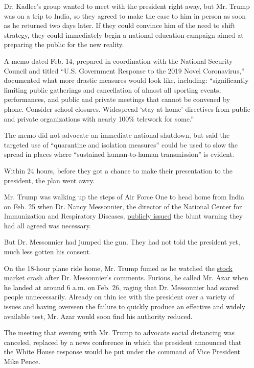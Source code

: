 Dr. Kadlec's group wanted to meet with the president right away, but Mr.
Trump was on a trip to India, so they agreed to make the case to him in
person as soon as he returned two days later. If they could convince him
of the need to shift strategy, they could immediately begin a national
education campaign aimed at preparing the public for the new reality.

A memo dated Feb. 14, prepared in coordination with the National
Security Council and titled ``U.S. Government Response to the 2019 Novel
Coronavirus,'' documented what more drastic measures would look like,
including: ``significantly limiting public gatherings and cancellation
of almost all sporting events, performances, and public and private
meetings that cannot be convened by phone. Consider school closures.
Widespread `stay at home' directives from public and private
organizations with nearly 100\% telework for some.''

The memo did not advocate an immediate national shutdown, but said the
targeted use of ``quarantine and isolation measures'' could be used to
slow the spread in places where ``sustained human-to-human
transmission'' is evident.

Within 24 hours, before they got a chance to make their presentation to
the president, the plan went awry.

Mr. Trump was walking up the steps of Air Force One to head home from
India on Feb. 25 when Dr. Nancy Messonnier, the director of the National
Center for Immunization and Respiratory Diseases,
\href{https://www.cdc.gov/media/releases/2020/t0225-cdc-telebriefing-covid-19.html}{publicly
issued} the blunt warning they had all agreed was necessary.

But Dr. Messonnier had jumped the gun. They had not told the president
yet, much less gotten his consent.

On the 18-hour plane ride home, Mr. Trump fumed as he watched the
\href{https://www.nytimes.com/2020/02/24/business/stock-market-coronavirus.html}{stock
market crash} after Dr. Messonnier's comments. Furious, he called Mr.
Azar when he landed at around 6 a.m. on Feb. 26, raging that Dr.
Messonnier had scared people unnecessarily. Already on thin ice with the
president over a variety of issues and having overseen the failure to
quickly produce an effective and widely available test, Mr. Azar would
soon find his authority reduced.

The meeting that evening with Mr. Trump to advocate social distancing
was canceled, replaced by a news conference in which the president
announced that the White House response would be put under the command
of Vice President Mike Pence.

